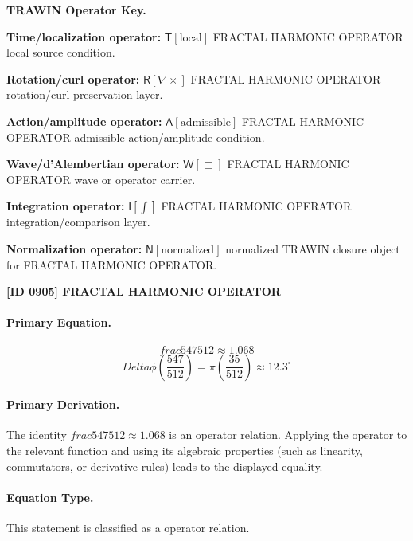 \par\vspace{0.45\baselineskip}
\noindent\begin{minipage}[t]{\linewidth}
\begingroup
\small
\raggedright
\textbf{TRAWIN Operator Key.}\par
\noindent\textbf{Time/localization operator:} $\mathsf{T}\!\left[\mathrm{local}\right]$ FRACTAL HARMONIC OPERATOR local source condition.\par
\noindent\textbf{Rotation/curl operator:} $\mathsf{R}\!\left[\nabla\times\right]$ FRACTAL HARMONIC OPERATOR rotation/curl preservation layer.\par
\noindent\textbf{Action/amplitude operator:} $\mathsf{A}\!\left[\mathrm{admissible}\right]$ FRACTAL HARMONIC OPERATOR admissible action/amplitude condition.\par
\noindent\textbf{Wave/d'Alembertian operator:} $\mathsf{W}\!\left[\Box\right]$ FRACTAL HARMONIC OPERATOR wave or operator carrier.\par
\noindent\textbf{Integration operator:} $\mathsf{I}\!\left[\int\right]$ FRACTAL HARMONIC OPERATOR integration/comparison layer.\par
\noindent\textbf{Normalization operator:} $\mathsf{N}\!\left[\mathrm{normalized}\right]$ normalized TRAWIN closure object for FRACTAL HARMONIC OPERATOR.\par
\endgroup
\end{minipage}

\clearpage
\noindent\textbf{[ID 0905] FRACTAL HARMONIC OPERATOR}\par
\vspace{0.35em}
\paragraph{Primary Equation.}
\[
frac{547}{512} \approx 1.068
\]
\[
Delta\phi\left(\frac{547}{512}\right) = \pi\left(\frac{35}{512}\right) \approx 12.3^\circ
\]

\paragraph{Primary Derivation.}
The identity \( frac{547}{512} \approx 1.068 \) is an operator relation. Applying the operator to the relevant function and using its algebraic properties (such as linearity, commutators, or derivative rules) leads to the displayed equality.
\paragraph{Equation Type.}
This statement is classified as a operator relation.


